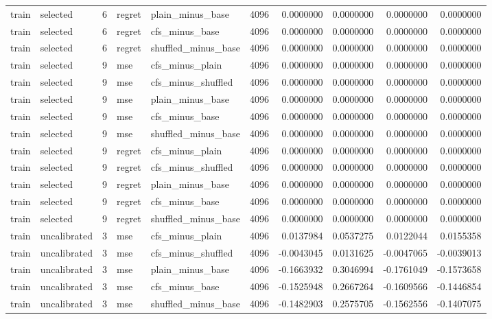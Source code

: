 \begin{tabular}{llrllrrrrr}
train & selected & 6 & regret & plain_minus_base & 4096 & 0.0000000 & 0.0000000 & 0.0000000 & 0.0000000 \\
train & selected & 6 & regret & cfs_minus_base & 4096 & 0.0000000 & 0.0000000 & 0.0000000 & 0.0000000 \\
train & selected & 6 & regret & shuffled_minus_base & 4096 & 0.0000000 & 0.0000000 & 0.0000000 & 0.0000000 \\
train & selected & 9 & mse & cfs_minus_plain & 4096 & 0.0000000 & 0.0000000 & 0.0000000 & 0.0000000 \\
train & selected & 9 & mse & cfs_minus_shuffled & 4096 & 0.0000000 & 0.0000000 & 0.0000000 & 0.0000000 \\
train & selected & 9 & mse & plain_minus_base & 4096 & 0.0000000 & 0.0000000 & 0.0000000 & 0.0000000 \\
train & selected & 9 & mse & cfs_minus_base & 4096 & 0.0000000 & 0.0000000 & 0.0000000 & 0.0000000 \\
train & selected & 9 & mse & shuffled_minus_base & 4096 & 0.0000000 & 0.0000000 & 0.0000000 & 0.0000000 \\
train & selected & 9 & regret & cfs_minus_plain & 4096 & 0.0000000 & 0.0000000 & 0.0000000 & 0.0000000 \\
train & selected & 9 & regret & cfs_minus_shuffled & 4096 & 0.0000000 & 0.0000000 & 0.0000000 & 0.0000000 \\
train & selected & 9 & regret & plain_minus_base & 4096 & 0.0000000 & 0.0000000 & 0.0000000 & 0.0000000 \\
train & selected & 9 & regret & cfs_minus_base & 4096 & 0.0000000 & 0.0000000 & 0.0000000 & 0.0000000 \\
train & selected & 9 & regret & shuffled_minus_base & 4096 & 0.0000000 & 0.0000000 & 0.0000000 & 0.0000000 \\
train & uncalibrated & 3 & mse & cfs_minus_plain & 4096 & 0.0137984 & 0.0537275 & 0.0122044 & 0.0155358 \\
train & uncalibrated & 3 & mse & cfs_minus_shuffled & 4096 & -0.0043045 & 0.0131625 & -0.0047065 & -0.0039013 \\
train & uncalibrated & 3 & mse & plain_minus_base & 4096 & -0.1663932 & 0.3046994 & -0.1761049 & -0.1573658 \\
train & uncalibrated & 3 & mse & cfs_minus_base & 4096 & -0.1525948 & 0.2667264 & -0.1609566 & -0.1446854 \\
train & uncalibrated & 3 & mse & shuffled_minus_base & 4096 & -0.1482903 & 0.2575705 & -0.1562556 & -0.1407075 \\

\end{tabular}
